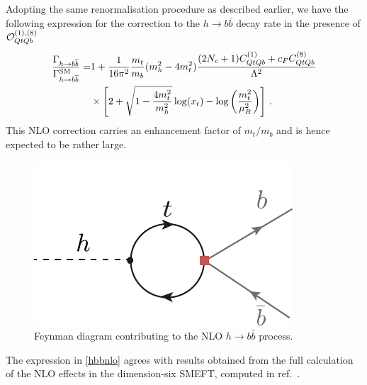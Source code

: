 \begin{description}
		Adopting the same renormalisation procedure as described earlier, we have the following expression for the correction to 
		the $h \to b\bar b$ decay rate in the presence of ${\cal O}_{QtQb}^{(1),(8)}$
		\begin{equation}
			\begin{split}
				\frac{\Gamma_{h\to b\overline{b}}}{\Gamma_{h\to b\overline{b}}^{\mathrm{SM}}}=& 1+ \frac{1}{16\pi^2}\frac{m_t}{m_b}(m_h^2-4m_t^2)\frac{(2 N_c+1) C_{QtQb}^{(1)}+c_F C_{QtQb}^{(8)}}{\Lambda^2} \\ & \times\left[ 2+\sqrt{1-\frac{4 m_t^2}{m_h^2}}\log(x_t)-\log\left(\frac{m_t^2}{\mu_R^2}\right) \right] \,.
				\label{hbbnlo}
			\end{split}
		\end{equation}
		This NLO correction carries an enhancement factor of $m_t/m_b$ and is hence expected to be rather large.
	\end{description}
	\begin{figure}[h!]
		\centering
		\includegraphics[scale=0.8]{./figures/Hbb}
		\caption{Feynman diagram contributing to the NLO   $h \to b \bar b$ process. }
		\label{hbb}
	\end{figure}
	The expression in \eqref{hbbnlo} agrees with results obtained from the full calculation of the NLO effects in the dimension-six SMEFT, computed in ref.~\cite{Gauld:2015lmb}. 
	
